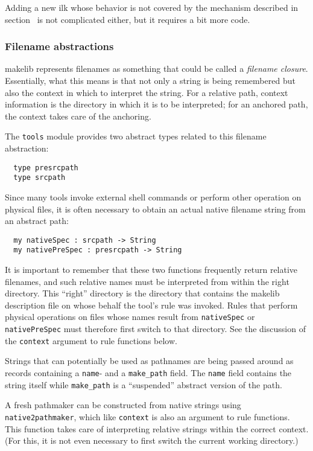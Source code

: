 Adding a new ilk whose behavior is not covered by the mechanism
described in section~ is not complicated
either, but it requires a bit more code.

\subsubsection{Filename abstractions}

makelib represents filenames as something that could be called a {\em
filename closure}.  Essentially, what this means is that not only a
string is being remembered but also the context in which to interpret
the string.  For a relative path, context information is the directory
in which it is to be interpreted; for an anchored path, the context
takes care of the anchoring.

The {\tt tools} module provides two abstract types related to this
filename abstraction:

\begin{verbatim}
  type presrcpath
  type srcpath
\end{verbatim}

Since many tools invoke external shell commands or perform other
operation on physical files, it is often necessary to obtain an actual
native filename string from an abstract path:

\begin{verbatim}
  my nativeSpec : srcpath -> String
  my nativePreSpec : presrcpath -> String
\end{verbatim}

It is important to remember that these two functions frequently return
relative filenames, and such relative names must be interpreted from
within the right directory.  This ``right'' directory is the directory
that contains the makelib description file on whose behalf the tool's rule
was invoked.  Rules that perform physical operations on files whose
names result from {\tt nativeSpec} or {\tt nativePreSpec} must
therefore first switch to that directory.  See the discussion of the
{\tt context} argument to rule functions below.

Strings that can potentially be used as pathnames are being passed
around as records containing a {\tt name}- and a {\tt make_path} field.
The {\tt name} field contains the string itself while {\tt make_path}
is a ``suspended'' abstract version of the path.

A fresh pathmaker can be constructed from native strings using {\tt
native2pathmaker}, which like {\tt context} is also an argument to
rule functions.  This function takes care of interpreting relative
strings within the correct context.  (For this, it is not even
necessary to first switch the current working directory.)

